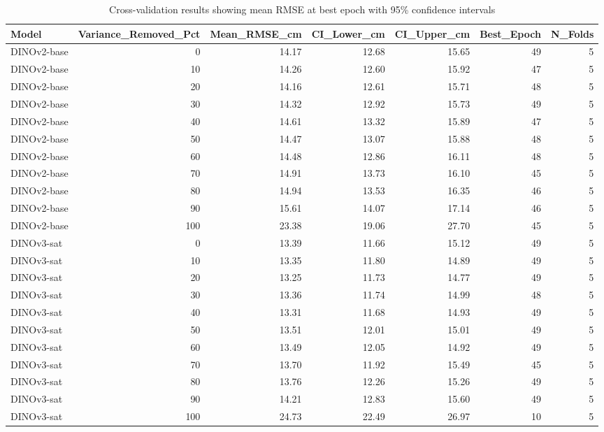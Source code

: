 \begin{table}
\caption{Cross-validation results showing mean RMSE at best epoch with 95\% confidence intervals}
\label{tab:cv_results}
\begin{tabular}{lrrrrrr}
\toprule
Model & Variance_Removed_Pct & Mean_RMSE_cm & CI_Lower_cm & CI_Upper_cm & Best_Epoch & N_Folds \\
\midrule
DINOv2-base & 0 & 14.17 & 12.68 & 15.65 & 49 & 5 \\
DINOv2-base & 10 & 14.26 & 12.60 & 15.92 & 47 & 5 \\
DINOv2-base & 20 & 14.16 & 12.61 & 15.71 & 48 & 5 \\
DINOv2-base & 30 & 14.32 & 12.92 & 15.73 & 49 & 5 \\
DINOv2-base & 40 & 14.61 & 13.32 & 15.89 & 47 & 5 \\
DINOv2-base & 50 & 14.47 & 13.07 & 15.88 & 48 & 5 \\
DINOv2-base & 60 & 14.48 & 12.86 & 16.11 & 48 & 5 \\
DINOv2-base & 70 & 14.91 & 13.73 & 16.10 & 45 & 5 \\
DINOv2-base & 80 & 14.94 & 13.53 & 16.35 & 46 & 5 \\
DINOv2-base & 90 & 15.61 & 14.07 & 17.14 & 46 & 5 \\
DINOv2-base & 100 & 23.38 & 19.06 & 27.70 & 45 & 5 \\
DINOv3-sat & 0 & 13.39 & 11.66 & 15.12 & 49 & 5 \\
DINOv3-sat & 10 & 13.35 & 11.80 & 14.89 & 49 & 5 \\
DINOv3-sat & 20 & 13.25 & 11.73 & 14.77 & 49 & 5 \\
DINOv3-sat & 30 & 13.36 & 11.74 & 14.99 & 48 & 5 \\
DINOv3-sat & 40 & 13.31 & 11.68 & 14.93 & 49 & 5 \\
DINOv3-sat & 50 & 13.51 & 12.01 & 15.01 & 49 & 5 \\
DINOv3-sat & 60 & 13.49 & 12.05 & 14.92 & 49 & 5 \\
DINOv3-sat & 70 & 13.70 & 11.92 & 15.49 & 45 & 5 \\
DINOv3-sat & 80 & 13.76 & 12.26 & 15.26 & 49 & 5 \\
DINOv3-sat & 90 & 14.21 & 12.83 & 15.60 & 49 & 5 \\
DINOv3-sat & 100 & 24.73 & 22.49 & 26.97 & 10 & 5 \\
\bottomrule
\end{tabular}
\end{table}
